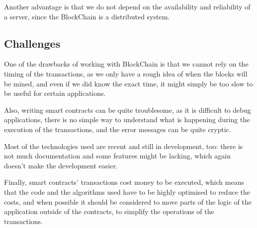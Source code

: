 \documentclass[10pt]{article}
\begin{document}
Another advantage is that we do not depend on the availability and reliability
of a server, since the BlockChain is a distributed system.

\subsection{Challenges}
One of the drawbacks of working with BlockChain is that we cannot rely on the
timing of the transactions, as we only have a rough idea of when the blocks
will be mined, and even if we did know the exact time, it might simply be too slow
 to be useful for certain applications.

Also, writing smart contracts can be quite troublesome, as it is difficult to
debug applications, there is no simple way to understand what is happening
during the execution of the transactions, and the error messages can be quite
cryptic.

Most of the technologies used are recent and still in development, too: there is
not much documentation and some features might be lacking, which again doesn't
make the development easier.

Finally, smart contracts' transactions cost money to be executed, which means
that the code and the algorithms used have to be highly optimised to reduce the
costs, and when possible it should be considered to move parts of the logic of
the application outside of the contracts, to simplify the operations of the
transactions.
\end{document}
